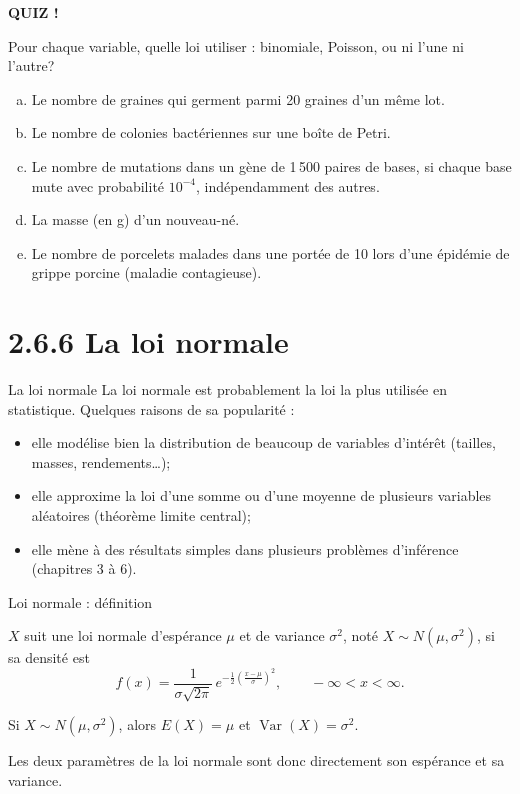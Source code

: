 \documentclass{BeamerTemplate}
\begin{document}
\begin{frame}[plain,t]
  \centerline{\LARGE\bfseries\alert{QUIZ !}}

  \medskip
  Pour chaque variable, quelle loi utiliser : \alert{binomiale},
  \alert{Poisson}, ou \alert{ni l'une ni l'autre}?
  \begin{enumerate}[a)]\itemsep 4mm
    \item Le nombre de graines qui germent parmi 20 graines d'un même lot.
    \item Le nombre de colonies bactériennes sur une boîte de Petri.
    \item Le nombre de mutations dans un gène de 1\,500 paires de bases, si
      chaque base mute avec probabilité $10^{-4}$, indépendamment des autres.
    \item La masse (en g) d'un nouveau-né.
    \item Le nombre de porcelets malades dans une portée de 10 lors d'une
      épidémie de grippe porcine (maladie contagieuse).
  \end{enumerate}
\end{frame}

\section[Loi normale]{2.6.6 La loi normale}

\begin{frame}[t]{La loi normale}
  La loi normale est probablement la loi la plus utilisée en statistique.
  Quelques raisons de sa popularité :
  \begin{itemize}\itemsep 2mm
    \item elle modélise bien la distribution de beaucoup de variables d'intérêt
      (tailles, masses, rendements\ldots);
    \item elle approxime la loi d'une somme ou d'une moyenne de plusieurs
      variables aléatoires (\alert{théorème limite central});
    \item elle mène à des résultats simples dans plusieurs problèmes
      d'inférence (chapitres 3 à 6).
  \end{itemize}

\end{frame}

\begin{frame}[t]{Loi normale : définition}
  \begin{defn}
    $X$ suit une \alert{loi normale} d'espérance $\mu$ et de variance
    $\sigma^2$, noté $X \sim N(\mu, \sigma^2)$, si sa densité est
    \[
      f(x) = \frac{1}{\sigma\sqrt{2\pi}}\, e^{-\frac{1}{2}\left(\frac{x-\mu}{\sigma}\right)^2},
      \qquad -\infty < x < \infty.
    \]
  \end{defn}
  \begin{prp}
    Si $X \sim N(\mu, \sigma^2)$, alors $E(X) = \mu$ et $\operatorname{Var}(X) = \sigma^2$.
  \end{prp}
  Les deux paramètres de la loi normale sont donc directement son espérance et
  sa variance.
\end{frame}
\end{document}
